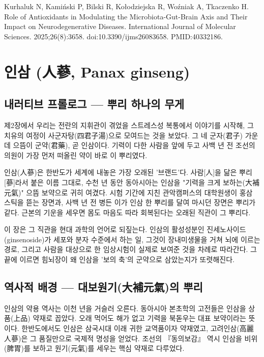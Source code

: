 \documentclass[12pt,oneside]{book}
\newcommand{\refend}{\endgroup\par}
\newcommand{\reff}[2]{\par\hangindent=7mm\hangafter=1\noindent[#1]\hspace{2mm}#2\par}
\begin{document}
\reff{80}{Kurhaluk N, Kamiński P, Bilski R, Kołodziejska R, Woźniak A, Tkaczenko H. Role of Antioxidants in Modulating the Microbiota-Gut-Brain Axis and Their Impact on Neurodegenerative Diseases. International Journal of Molecular Sciences. 2025;26(8):3658. doi:10.3390/ijms26083658. PMID:40332186.}

\refend


\chapter{인삼 (人蔘, Panax ginseng)}

\section{내러티브 프롤로그 — 뿌리 하나의 무게}

제2장에서 우리는 전란의 지휘관이 겪었을 스트레스성 복통에서 이야기를 시작해, 그 치유의 여정이 사군자탕(四君子湯)으로 모여드는 것을 보았다. 그 네 군자(君子) 가운데 으뜸이 군약(君藥), 곧 인삼이다. 기력이 다한 사람을 앞에 두고 사백 년 전 조선의 의원이 가장 먼저 떠올린 약이 바로 이 뿌리였다.

인삼(人蔘)은 한반도가 세계에 내놓은 가장 오래된 '브랜드'다. 사람[人]을 닮은 뿌리[蔘]라서 붙은 이름 그대로, 수천 년 동안 동아시아는 인삼을 "기력을 크게 보하는(大補元氣)" 으뜸 보약으로 귀히 여겼다. 시험 기간에 지친 관악캠퍼스의 대학원생이 홍삼 스틱을 뜯는 장면과, 사백 년 전 병든 이가 인삼 한 뿌리를 달여 마시던 장면은 뿌리가 같다. 근본의 기운을 세우면 몸도 마음도 따라 회복된다는 오래된 직관이 그 뿌리다.

이 장은 그 직관을 현대 과학의 언어로 되짚는다. 인삼의 활성성분인 진세노사이드(ginsenoside)가 세포와 분자 수준에서 하는 일, 그것이 장내미생물을 거쳐 뇌에 이르는 경로, 그리고 사람을 대상으로 한 임상시험이 실제로 보여준 것을 차례로 따라간다. 그 끝에 이르면 힘뇌장이 왜 인삼을 '보의 축'의 군약으로 삼았는지가 또렷해진다.

\section{역사적 배경 — 대보원기(大補元氣)의 뿌리}

인삼의 약용 역사는 이천 년을 거슬러 오른다. 동아시아 본초학의 고전들은 인삼을 상품(上品) 약재로 꼽았다. 오래 먹어도 해가 없고 기력을 북돋우는 대표 보약이라는 뜻이다. 한반도에서도 인삼은 삼국시대 이래 귀한 교역품이자 약재였고, 고려인삼(高麗人蔘)은 그 품질만으로 국제적 명성을 얻었다. 조선의 『동의보감』 역시 인삼을 비위(脾胃)를 보하고 원기(元氣)를 세우는 핵심 약재로 다루었다.
\end{document}
